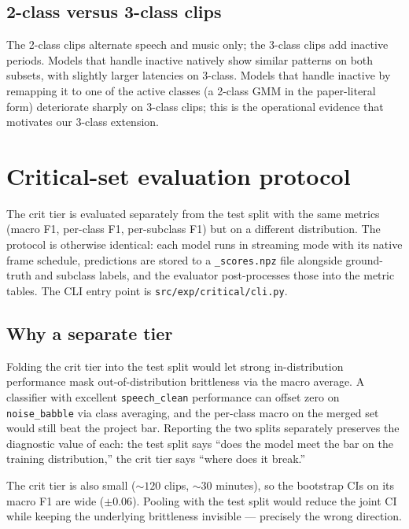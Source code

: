 \subsection*{2-class versus 3-class clips}

The 2-class clips alternate speech and music only; the 3-class clips add inactive periods.
Models that handle inactive natively show similar patterns on both subsets, with slightly larger latencies on 3-class.
Models that handle inactive by remapping it to one of the active classes (a 2-class GMM in the paper-literal form) deteriorate sharply on 3-class clips; this is the operational evidence that motivates our 3-class extension.

\section{Critical-set evaluation protocol}
\label{sec:eval_critical}

The crit tier is evaluated separately from the test split with the same metrics (macro F1, per-class F1, per-subclass F1) but on a different distribution.
The protocol is otherwise identical: each model runs in streaming mode with its native frame schedule, predictions are stored to a \texttt{\_scores.npz} file alongside ground-truth and subclass labels, and the evaluator post-processes those into the metric tables.
The CLI entry point is \texttt{src/exp/critical/cli.py}.

\subsection*{Why a separate tier}

Folding the crit tier into the test split would let strong in-distribution performance mask out-of-distribution brittleness via the macro average.
A classifier with excellent \texttt{speech\_clean} performance can offset zero on \texttt{noise\_babble} via class averaging, and the per-class macro on the merged set would still beat the project bar.
Reporting the two splits separately preserves the diagnostic value of each: the test split says ``does the model meet the bar on the training distribution,'' the crit tier says ``where does it break.''

The crit tier is also small ($\sim 120$ clips, $\sim 30$ minutes), so the bootstrap CIs on its macro F1 are wide ($\pm 0.06$).
Pooling with the test split would reduce the joint CI while keeping the underlying brittleness invisible — precisely the wrong direction.


